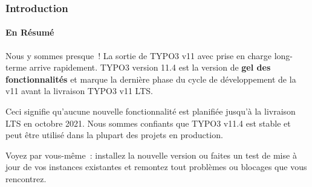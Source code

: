 %

\begin{frame}[fragile]
	\frametitle{Introduction}
	\framesubtitle{En Résumé}

	\small

        Nous y sommes presque ! La sortie de TYPO3 v11 avec prise en charge long-terme
        arrive rapidement. TYPO3 version 11.4 est la version de
        \textbf{gel des fonctionnalités} et marque la dernière phase du cycle de
        développement de la v11 avant la livraison TYPO3 v11 LTS.

		\vspace{0.2cm}

        Ceci signifie qu'aucune nouvelle fonctionnalité est planifiée jusqu'à la
        livraison LTS en octobre 2021. Nous sommes confiants que TYPO3 v11.4 est
        stable et peut être utilisé dans la plupart des projets en production.

		\vspace{0.2cm}

        Voyez par vous-même : installez la nouvelle version ou faites un test
        de mise à jour de vos instances existantes et remontez tout problèmes ou
        blocages que vous rencontrez.
	\normalsize

\end{frame}

